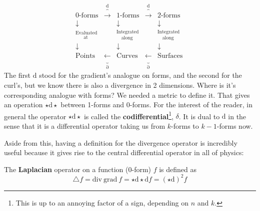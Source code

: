 		\begin{equation*}
			~~~~~~
			\begin{matrix}
				\text{0-forms} & \overbrace{\longrightarrow}^\mathrm d & 
				\text{1-forms} & \overbrace{\longrightarrow}^\mathrm d & 
				\text{2-forms}  \\
				\downarrow & & \downarrow & & \downarrow \\
				^{\text{Evaluated}}_{\text{~~~~~at}} & & 
				^{\text{Integrated}}_{\text{~~~along}} & &
				^{\text{Integrated}}_{\text{~~~along}} & &\\
				\downarrow & & \downarrow & & \downarrow \\
				\text{Points} & \underbrace{\longleftarrow}_\partial & 
				\text{Curves} & \underbrace{\longleftarrow}_\partial & 
				\text{Surfaces} 
			
			\end{matrix}
		\end{equation*}
		The first $\mathrm d$ stood for the gradient's analogue on forms, and the second for the curl's, but we know there is also a divergence in 2 dimensions. Where is it's corresponding analogue with forms? We needed a metric to define it. That gives an operation $\star \mathrm d \star$ between 1-forms and 0-forms. For the interest of the reader, in general the operator $\star \mathrm d \star$ is called the \textbf{codifferential}\footnote{This is up to an annoying factor of a sign, depending on $n$ and $k$.}, $\delta$. It is dual to $\mathrm d$ in the sense that it is a differential operator taking us from $k$-forms to $k-1$-forms now. 
	
	Aside from this, having a definition for the divergence operator is incredibly useful because it gives rise to the central differential operator in all of physics:
	
	\begin{defn}
		The \textbf{Laplacian} operator on a function (0-form) $f$ is defined as 
		\begin{equation}
			\triangle f = \mathrm{div} ~ \mathrm{grad} ~ f 
			= \star \mathrm d \star \mathrm d f
			= (\star \mathrm d)^2 f
		\end{equation}
	\end{defn}
	

